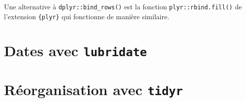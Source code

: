 \documentclass[
  letterpaper,
  DIV=11,
  numbers=noendperiod,
  oneside]{scrreprt}
\begin{document}
Une alternative à \texttt{dplyr::bind\_rows()} est la fonction
\texttt{plyr::rbind.fill()} de l'extension \texttt{\{plyr\}} qui
fonctionne de manière similaire.

\hypertarget{sec-dates}{%
\chapter{\texorpdfstring{Dates avec
\texttt{lubridate}}{Dates avec lubridate}}\label{sec-dates}}

\hypertarget{sec-tidyr}{%
\chapter{\texorpdfstring{Réorganisation avec
\texttt{tidyr}}{Réorganisation avec tidyr}}\label{sec-tidyr}}
\end{document}
